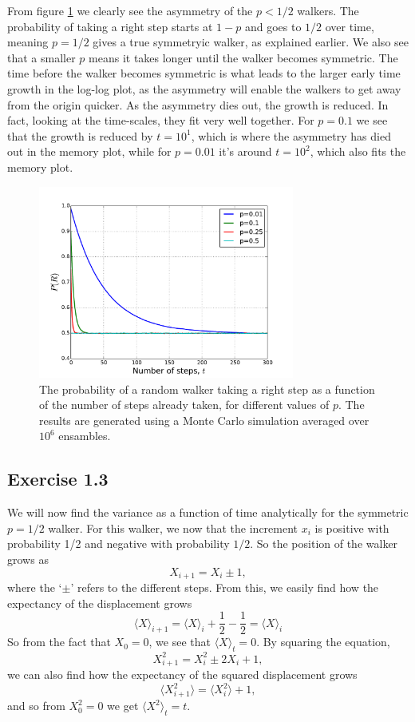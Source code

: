 \documentclass[a4paper, 11pt, notitlepage, english]{article}
\begin{document}
From figure \ref{fig:system_memory} we clearly see the asymmetry of the $p<1/2$ walkers. The probability of taking a right step starts at $1-p$ and goes to $1/2$ over time, meaning $p=1/2$ gives a true symmetryic walker, as explained earlier. We also see that a smaller $p$ means it takes longer until the walker becomes symmetric. The time before the walker becomes symmetric is what leads to the larger early time growth in the log-log plot, as the asymmetry will enable the walkers to get away from the origin quicker. As the asymmetry dies out, the growth is reduced. In fact, looking at the time-scales, they fit very well together. For $p=0.1$ we see that the growth is reduced by $t=10^1$, which is where the asymmetry has died out in the memory plot, while for $p=0.01$ it's around $t=10^2$, which also fits the memory plot.

\begin{figure}[h]
\centering
\includegraphics[width=0.75\textwidth]{memory.pdf}
\caption{The probability of a random walker taking a right step as a function of the number of steps already taken, for different values of $p$. The results are generated using a Monte Carlo simulation averaged over $10^6$ ensambles. \label{fig:system_memory}}
\end{figure}

\subsection*{Exercise 1.3}
We will now find the variance as a function of time analytically for the symmetric $p=1/2$ walker. For this walker, we now that the increment $x_i$ is positive with probability 1/2 and negative with probability $1/2$. So the position of the walker grows as
$$X_{i+1} = X_{i} \pm 1,$$
where the `$\pm$' refers to the different steps. From this, we easily find how the expectancy of the displacement grows
$$\langle X \rangle_{i+1} = \langle X \rangle_i + \frac{1}{2} - \frac{1}{2} = \langle X \rangle_i$$
So from the fact that $X_0 = 0$, we see that $\langle X \rangle_t = 0.$ By squaring the equation,
$$X_{i+1}^2 = X_{i}^2 \pm 2X_{i} + 1,$$
we can also find how the expectancy of the squared displacement grows
$$\langle X_{i+1}^2 \rangle = \langle X_{i}^2 \rangle + 1,$$
and so from $X^2_0 = 0$ we get $\langle X^2\rangle_t = t$.
\end{document}
